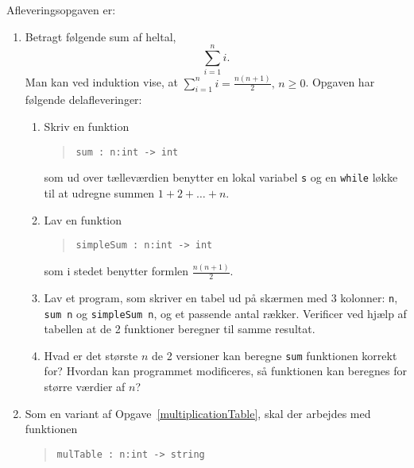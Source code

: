 \documentclass[a4paper,12pt]{article}
\begin{document}
Afleveringsopgaven er:
\begin{enumerate}[label=3i.\arabic*,start=0]
\item Betragt følgende sum af heltal,
  \begin{equation}
    \sum_{i=1}^n i.
  \end{equation}
  Man kan ved induktion vise, at $\sum_{i=1}^n i = \frac{n(n+1)}{2},\, n\geq 0$. Opgaven har følgende delafleveringer:
  \begin{enumerate}
  \item \label{sum} Skriv en funktion
    \begin{quote}
      \mbox{\lstinline!sum : n:int -> int!}
    \end{quote}
    som ud over tælleværdien benytter en lokal variabel \lstinline!s! og en \lstinline!while! løkke til at udregne summen $1 + 2 + \dots + n$.
  \item Lav en funktion
    \begin{quote}
      \mbox{\lstinline!simpleSum : n:int -> int!}
    \end{quote}
    som i stedet benytter formlen $\frac{n(n+1)}{2}$.
  \item Lav et program, som skriver en tabel ud på skærmen med 3 kolonner: \lstinline!n!, \lstinline!sum n! og \mbox{\lstinline!simpleSum n!}, og et passende antal rækker. Verificer ved hjælp af tabellen at de 2 funktioner beregner til samme resultat.
  \item Hvad er det største $n$ de 2 versioner kan beregne \lstinline{sum} funktionen korrekt for? Hvordan kan programmet modificeres, så funktionen kan beregnes for større værdier af $n$?
  \end{enumerate}
\item Som en variant af Opgave~\ref{multiplicationTable}, skal der arbejdes med funktionen
  \begin{quote}
    \mbox{\lstinline!mulTable : n:int -> string!}

\end{quote}
\end{enumerate}
\end{document}
